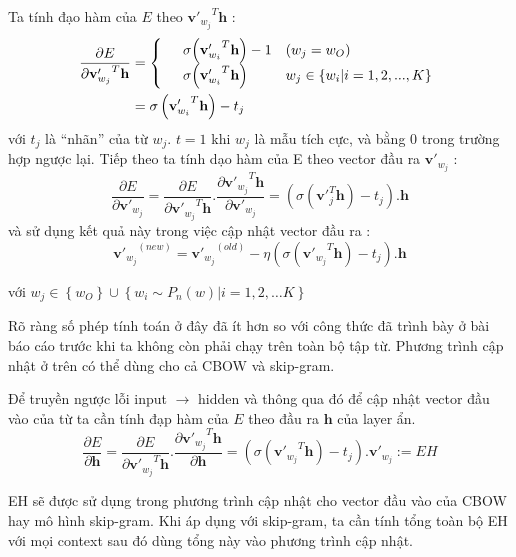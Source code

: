 Ta tính đạo hàm của $E$ theo ${\textbf{v}'_{w_j}}^{T} \textbf{h}$ :
\begin{equation}
\begin{split}
\dfrac{\partial{E}}{\partial{{\textbf{v}'_{w_j}}^{T} \textbf{h}}} &= \left\{ \begin{array}{l l}
    \quad \sigma{ \left( {\textbf{v}'_{w_i}}^{T} \textbf{h}\right) } - 1 &  (w_j=w_O) \\
    \quad \sigma{ \left( {\textbf{v}'_{w_i}}^{T} \textbf{h}\right) } &  w_j \in \left\lbrace w_i|i=1,2,...,K \right\rbrace \\
  \end{array} \right. \\
  &= \sigma \left( {\textbf{v}'_{w_i}}^{T} \textbf{h}\right) - t_j
\end{split}
\end{equation}
với $t_j$ là “nhãn” của từ $w_j$. $t=1$ khi $w_j$ là mẫu tích cực, và bằng 0 trong trường hợp ngược lại. 
	Tiếp theo ta tính dạo hàm của E theo vector đầu ra $\textbf{v}'_{w_j}$ :
\begin{equation}
\dfrac{\partial{E}}{\partial{\textbf{v}'_{w_j}}} = \dfrac{\partial{E}}{\partial{{\textbf{v}'_{w_j}}^{T} \textbf{h}}} . \dfrac{\partial{{\textbf{v}'_{w_j}}^{T} \textbf{h}}}{\partial{\textbf{v}'_{w_j}}} = \left( \sigma \left( \textbf{v}'^{T}_{j} \textbf{h}\right) - t_j \right) . \textbf{h}
\end{equation}
và sử dụng kết quả này trong việc cập nhật vector đầu ra :
\begin{equation}
{\textbf{v}'_{w_j}}^{(new)} = {\textbf{v}'_{w_j}}^{(old)} - \eta \left( \sigma \left( {\textbf{v}'_{w_j}}^{T} \textbf{h}\right) - t_j \right) . \textbf{h}
\end{equation}

với $w_j  \in \left\lbrace w_O \right\rbrace \cup \left\lbrace w_i \sim P_n(w)|i=1,2,…K \right\rbrace $

Rõ ràng  số phép tính toán ở đây đã ít hơn so với công thức đã trình bày ở bài báo cáo trước khi ta không còn phải chạy trên toàn bộ tập từ. Phương trình cập nhật ở trên có thể dùng cho cả CBOW và skip-gram. 
 
 Để truyền ngược lỗi input $\rightarrow$ hidden và thông qua đó để cập nhật vector đầu vào của từ ta cần tính đạp hàm của $E$ theo đầu ra $\textbf{h}$ của layer ẩn. 
\begin{equation}
\dfrac{ \partial{E} }{\partial{\textbf{h}}} =\dfrac {\partial{E}}{\partial{ {\textbf{v}'_{w_j}}^{T} \textbf{h}}} . \dfrac{\partial{{\textbf{v}'_{w_j}}^{T} \textbf{h}}}{\partial{ \textbf{h}}} =\left( \sigma  \left( {\textbf{v}'_{w_j}}^{T} \textbf{h}\right) - t_j \right) . \textbf{v}'_{w_j} :=EH
\end{equation}
 
EH sẽ được sử dụng trong phương trình cập nhật cho vector đầu vào của CBOW hay mô hình skip-gram. Khi áp dụng với skip-gram, ta cần tính tổng toàn bộ EH với mọi context sau đó dùng tổng này vào phương trình cập nhật.